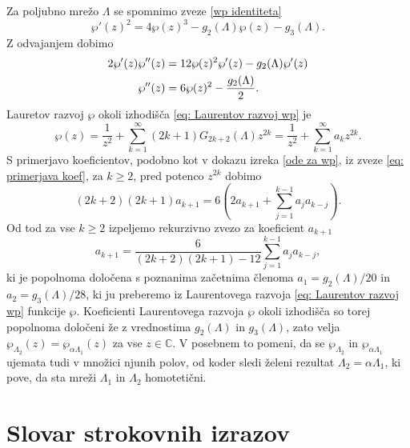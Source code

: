 \documentclass[mat1]{fmfdelo}
\numberwithin{equation}{section}
\newcommand{\C}{\mathbb C}
\theoremstyle{definition}
\begin{document}
\begin{dokaz}
    Za poljubno mrežo $\Lambda$ se spomnimo zveze \eqref{wp identiteta}
    \[
        \wp'(z)^2 = 4\wp(z)^3 - g_2(\Lambda)\wp(z) - g_3(\Lambda). 
    \]
    Z odvajanjem dobimo 
    \begin{align}
        \notag 2\wp'(z)\wp''(z) &= 12\wp(z)^2\wp'(z) - g_2(\Lambda)\wp'(z) \\
        \label{eq: primerjava koef} \wp''(z) &= 6\wp(z)^2 - \frac{g_2(\Lambda)}{2}.
    \end{align}
    Lauretov razvoj $\wp$ okoli izhodišča \eqref{eq: Laurentov razvoj wp} je
    \[
        \wp(z) = \frac{1}{z^2} + \sum_{k = 1}^\infty (2k+1)G_{2k+2}(\Lambda)z^{2k} = \frac{1}{z^2} + \sum_{k = 1}^\infty a_{k}z^{2k}.
    \] 
    S primerjavo koeficientov, podobno kot v dokazu izreka \ref{ode za wp}, iz zveze \eqref{eq: primerjava koef}, za $k \geq 2$, pred potenco $z^{2k}$ dobimo 
    \[
        (2k + 2)(2k + 1)a_{k+1} = 6 \left(2a_{k+1} + \sum_{j = 1}^{k-1}a_j a_{k-j}\right).
    \]
    Od tod za vse $k \geq 2$ izpeljemo rekurzivno zvezo za koeficient $a_{k+1}$
    \[
        a_{k+1} = \frac{6}{(2k + 2)(2k + 1) - 12}\sum_{j = 1}^{k-1}a_j a_{k-j},
    \]
    ki je popolnoma določena s poznanima začetnima členoma $a_1 = g_2(\Lambda)/20$ in $a_2 = g_3(\Lambda)/28$, ki ju preberemo iz Laurentovega razvoja \eqref{eq: Laurentov razvoj wp} funkcije $\wp$. Koeficienti Laurentovega razvoja $\wp$ okoli izhodišča so torej popolnoma določeni že z vrednostima $g_2(\Lambda)$ in $g_3(\Lambda)$, zato velja $\wp_{\Lambda_2}(z) = \wp_{\alpha\Lambda_1}(z)$ za vse $z \in \C$. V posebnem to pomeni, da se $\wp_{\Lambda_2}$ in $\wp_{\alpha\Lambda_1}$ ujemata tudi v množici njunih polov, od koder sledi želeni rezultat $\Lambda_2 = \alpha\Lambda_1$, ki pove, da sta mreži $\Lambda_1$ in $\Lambda_2$ homotetični.
\end{dokaz}


\section*{Slovar strokovnih izrazov}

\end{document}
